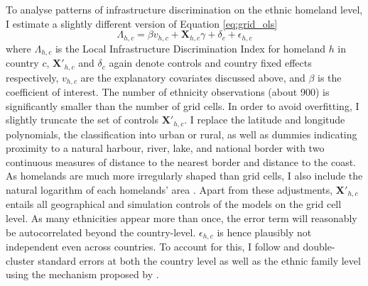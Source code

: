 \documentclass[11pt, oneside]{article}   	%
\begin{document}
To analyse patterns of infrastructure discrimination on the ethnic homeland level, I estimate a slightly different version of Equation \eqref{eq:grid_ols}
\begin{equation}
  \Lambda_{h,c} = \beta v_{h,c} + \textbf{X}_{h,c}\gamma + \delta_{c} + \epsilon_{h,c}
  \label{eq:ethn_ols}
\end{equation}
where $\Lambda_{h,c}$ is the Local Infrastructure Discrimination Index for homeland $h$ in country $c$, $\textbf{X}'_{h,c}$ and $\delta_{c}$ again denote controls and country fixed effects respectively, $v_{h,c}$ are the explanatory covariates discussed above, and $\beta$ is the coefficient of interest. The number of ethnicity observations (about 900) is significantly smaller than the number of grid cells. In order to avoid overfitting, I slightly truncate the set of controls $\textbf{X}'_{h,c}$. I replace the latitude and longitude polynomials, the classification into urban or rural, as well as dummies indicating proximity to a natural harbour, river, lake, and national border with two continuous measures of distance to the nearest border and distance to the coast. As homelands are much more irregularly shaped than grid cells, I also include the natural logarithm of each homelands' area \citep[as in][]{Michalopoulos_LongRunEffectsScramble_2016}. Apart from these adjustments, $\textbf{X}'_{h,c}$ entails all geographical and simulation controls of the models on the grid cell level. As many ethnicities appear more than once, the error term will reasonably be autocorrelated beyond the country-level. $\epsilon_{h,c}$ is hence plausibly not independent even across countries. To account for this, I follow \cite{Michalopoulos_LongRunEffectsScramble_2016} and double-cluster standard errors at both the country level as well as the ethnic family level using the mechanism proposed by \cite{Cameron_RobustInferenceMultiway_2011}.
\end{document}
